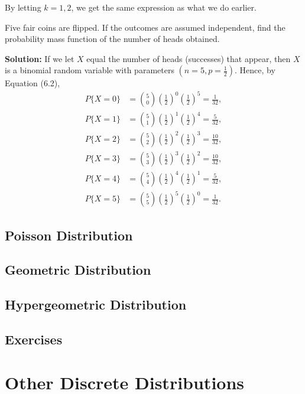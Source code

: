 By letting $k=1, 2$, we get the same expression as what we do earlier.

\begin{example}
    Five fair coins are flipped. If the outcomes are assumed independent, find the probability mass function of the number of heads obtained.

    \textbf{Solution:} If we let \( X \) equal the number of heads (successes) that appear, then \( X \) is a binomial random variable with parameters \( (n = 5, p = \frac{1}{2}) \). Hence, by Equation (6.2),
    \[
    \begin{aligned}
        P\{X = 0\} &= \binom{5}{0} \left( \frac{1}{2} \right)^0 \left( \frac{1}{2} \right)^5 = \frac{1}{32}, \\
        P\{X = 1\} &= \binom{5}{1} \left( \frac{1}{2} \right)^1 \left( \frac{1}{2} \right)^4 = \frac{5}{32}, \\
        P\{X = 2\} &= \binom{5}{2} \left( \frac{1}{2} \right)^2 \left( \frac{1}{2} \right)^3 = \frac{10}{32}, \\
        P\{X = 3\} &= \binom{5}{3} \left( \frac{1}{2} \right)^3 \left( \frac{1}{2} \right)^2 = \frac{10}{32}, \\
        P\{X = 4\} &= \binom{5}{4} \left( \frac{1}{2} \right)^4 \left( \frac{1}{2} \right)^1 = \frac{5}{32}, \\
        P\{X = 5\} &= \binom{5}{5} \left( \frac{1}{2} \right)^5 \left( \frac{1}{2} \right)^0 = \frac{1}{32}.
    \end{aligned}
    \]
\end{example}

\subsection{Poisson Distribution}
\subsection{Geometric Distribution}
\subsection{Hypergeometric Distribution}

\subsection{Exercises}

\section{Other Discrete Distributions}
